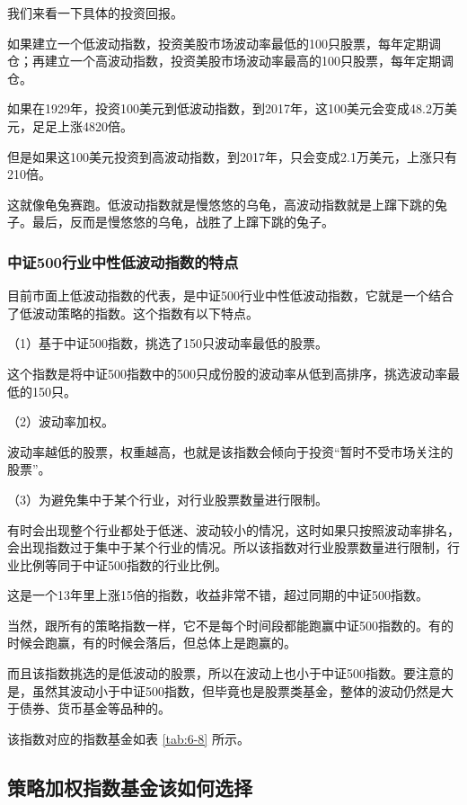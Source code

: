 我们来看一下具体的投资回报。

如果建立一个低波动指数，投资美股市场波动率最低的100只股票，每年定期调仓；再建立一个高波动指数，投资美股市场波动率最高的100只股票，每年定期调仓。

如果在1929年，投资100美元到低波动指数，到2017年，这100美元会变成48.2万美元，足足上涨4820倍。

但是如果这100美元投资到高波动指数，到2017年，只会变成2.1万美元，上涨只有210倍。

这就像龟兔赛跑。低波动指数就是慢悠悠的乌龟，高波动指数就是上蹿下跳的兔子。最后，反而是慢悠悠的乌龟，战胜了上蹿下跳的兔子。

\subsubsection{中证500行业中性低波动指数的特点}

目前市面上低波动指数的代表，是中证500行业中性低波动指数，它就是一个结合了低波动策略的指数。这个指数有以下特点。

（1）基于中证500指数，挑选了150只波动率最低的股票。

这个指数是将中证500指数中的500只成份股的波动率从低到高排序，挑选波动率最低的150只。

（2）波动率加权。

波动率越低的股票，权重越高，也就是该指数会倾向于投资“暂时不受市场关注的股票”。

（3）为避免集中于某个行业，对行业股票数量进行限制。

有时会出现整个行业都处于低迷、波动较小的情况，这时如果只按照波动率排名，会出现指数过于集中于某个行业的情况。所以该指数对行业股票数量进行限制，行业比例等同于中证500指数的行业比例。

这是一个13年里上涨15倍的指数，收益非常不错，超过同期的中证500指数。

当然，跟所有的策略指数一样，它不是每个时间段都能跑赢中证500指数的。有的时候会跑赢，有的时候会落后，但总体上是跑赢的。

而且该指数挑选的是低波动的股票，所以在波动上也小于中证500指数。要注意的是，虽然其波动小于中证500指数，但毕竟也是股票类基金，整体的波动仍然是大于债券、货币基金等品种的。

该指数对应的指数基金如表 \ref{tab:6-8} 所示。



\subsection{策略加权指数基金该如何选择}

